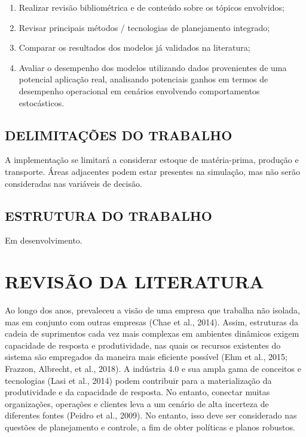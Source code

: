 \documentclass[
]{book}
\providecommand{\tightlist}{%
  \setlength{\itemsep}{0pt}\setlength{\parskip}{0pt}}
\begin{document}
\begin{enumerate}
\def\labelenumi{\arabic{enumi}.}
\tightlist
\item
  Realizar revisão bibliométrica e de conteúdo sobre os tópicos envolvidos;
\item
  Revisar principais métodos / tecnologias de planejamento integrado;
\item
  Comparar os resultados dos modelos já validados na literatura;
\item
  Avaliar o desempenho dos modelos utilizando dados provenientes de uma potencial aplicação real, analisando potenciais ganhos em termos de desempenho operacional em cenários envolvendo comportamentos estocásticos.
\end{enumerate}

\hypertarget{delimitauxe7uxf5es-do-trabalho}{%
\section{DELIMITAÇÕES DO TRABALHO}\label{delimitauxe7uxf5es-do-trabalho}}

A implementação se limitará a considerar estoque de matéria-prima, produção e transporte. Áreas adjacentes podem estar presentes na simulação, mas não serão consideradas nas variáveis de decisão.

\hypertarget{estrutura-do-trabalho}{%
\section{ESTRUTURA DO TRABALHO}\label{estrutura-do-trabalho}}

Em desenvolvimento.

\hypertarget{revisuxe3o-da-literatura}{%
\chapter{REVISÃO DA LITERATURA}\label{revisuxe3o-da-literatura}}

Ao longo dos anos, prevaleceu a visão de uma empresa que trabalha não isolada, mas em conjunto com outras empresas (Chae et al., 2014). Assim, estruturas da cadeia de suprimentos cada vez mais complexas em ambientes dinâmicos exigem capacidade de resposta e produtividade, nas quais os recursos existentes do sistema são empregados da maneira mais eficiente possível (Ehm et al., 2015; Frazzon, Albrecht, et al., 2018). A indústria 4.0 e sua ampla gama de conceitos e tecnologias (Lasi et al., 2014) podem contribuir para a materialização da produtividade e da capacidade de resposta. No entanto, conectar muitas organizações, operações e clientes leva a um cenário de alta incerteza de diferentes fontes (Peidro et al., 2009). No entanto, isso deve ser considerado nas questões de planejamento e controle, a fim de obter políticas e planos robustos.
\end{document}
